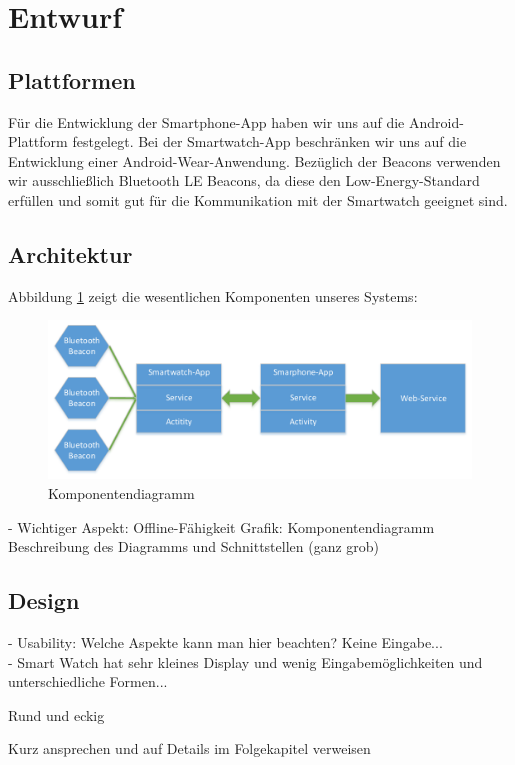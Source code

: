 \section{Entwurf}

\subsection{Plattformen}
Für die Entwicklung der Smartphone-App haben wir uns auf die Android-Plattform festgelegt. Bei der Smartwatch-App beschränken wir uns auf die Entwicklung einer Android-Wear-Anwendung. Bezüglich der Beacons verwenden wir ausschließlich Bluetooth LE Beacons, da diese den Low-Energy-Standard erfüllen und somit gut für die Kommunikation mit der Smartwatch geeignet sind.

\subsection{Architektur}
Abbildung \ref{fig:Übersicht} zeigt die wesentlichen Komponenten unseres Systems:

\begin{figure}[H]
\centering
\includegraphics[width=0.95\linewidth]{Bilder/Uebersicht}
\caption{Komponentendiagramm}
\label{fig:Übersicht}
\end{figure}

- Wichtiger Aspekt: Offline-Fähigkeit
Grafik: Komponentendiagramm
Beschreibung des Diagramms und Schnittstellen (ganz grob)

\subsection{Design}

- Usability: Welche Aspekte kann man hier beachten? Keine Eingabe...
\\- Smart Watch hat sehr kleines Display und wenig Eingabemöglichkeiten und unterschiedliche Formen...

Rund und eckig

Kurz ansprechen und auf Details im Folgekapitel verweisen